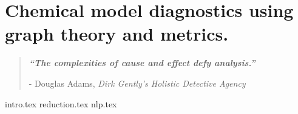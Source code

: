 

\chapter{ Chemical model diagnostics using graph theory and metrics.  }


\blankpage
\restoregeometry
\vspace*{0.15\paperheight}


\begin{center}
\begin{quotation}
  \large{\emph{\textbf{``The complexities of cause and effect defy analysis.''} }  }  \\
  \begin{flushright}
  - Douglas Adams, \textit{Dirk Gently's Holistic Detective Agency}

  \end{flushright}
 \end{quotation}
\end{center}
\newpage

\doublespacing

 {intro.tex}
 {reduction.tex}
 {nlp.tex}
%    
 
\chapterbib

